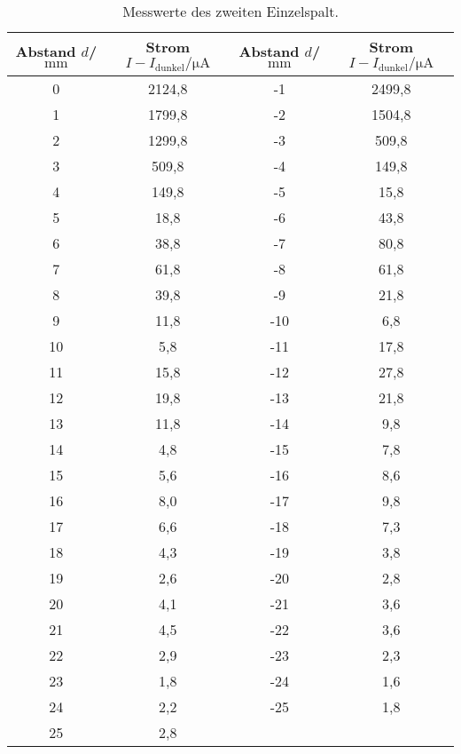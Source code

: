 \begin{table}
  \centering
  \caption{Messwerte des zweiten Einzelspalt.}
  \label{tab:spalt2}
  \begin{tabular}{c c c c}
Abstand $d$/$\si{\milli\meter}$ & Strom $I-I_\mathrm{dunkel}/\si{\micro\ampere}$&Abstand $d$/$\si{\milli\meter}$ & Strom $I-I_\mathrm{dunkel}/\si{\micro\ampere}$\\
  \midrule
  0  & 2124,8 & -1  & 2499,8\\
  1  & 1799,8 & -2  & 1504,8\\
  2  & 1299,8 & -3  & 509,8 \\
  3  & 509,8  & -4  & 149,8 \\
  4  & 149,8  & -5  & 15,8  \\
  5  &  18,8  & -6  & 43,8  \\
  6  & 38,8   & -7  & 80,8  \\
  7  & 61,8   & -8  & 61,8  \\
  8  & 39,8   & -9  & 21,8  \\
  9  & 11,8   & -10 & 6,8   \\
  10 & 5,8    & -11 & 17,8\\
  11 & 15,8   & -12 & 27,8\\
  12 & 19,8   & -13 & 21,8\\
  13 & 11,8   & -14 & 9,8     \\
  14 & 4,8    & -15 & 7,8     \\
  15 & 5,6    & -16 & 8,6     \\
  16 & 8,0    & -17 & 9,8   \\
  17 & 6,6    & -18 & 7,3   \\
  18 & 4,3    & -19 & 3,8   \\
  19 & 2,6    & -20 & 2,8       \\
  20 & 4,1    & -21 & 3,6       \\
  21 & 4,5    & -22 & 3,6       \\
  22 & 2,9    & -23 & 2,3     \\
  23 & 1,8    & -24 & 1,6     \\
  24 & 2,2    & -25 & 1,8 \\
  25 & 2,8    & &\\
  \bottomrule
  \end{tabular}
\end{table}

